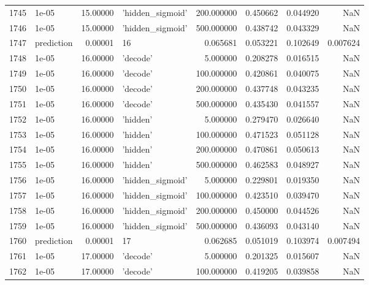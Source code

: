 \documentclass[10pt,a4paper]{article}
\begin{document}
\begin{tabular}{llrlrrrr}
1745 &       1e-05 &  15.00000 &   'hidden\_sigmoid' &  200.000000 &  0.450662 &  0.044920 &       NaN \\
1746 &       1e-05 &  15.00000 &   'hidden\_sigmoid' &  500.000000 &  0.438742 &  0.043329 &       NaN \\
1747 &  prediction &   0.00001 &                 16 &    0.065681 &  0.053221 &  0.102649 &  0.007624 \\
1748 &       1e-05 &  16.00000 &           'decode' &    5.000000 &  0.208278 &  0.016515 &       NaN \\
1749 &       1e-05 &  16.00000 &           'decode' &  100.000000 &  0.420861 &  0.040075 &       NaN \\
1750 &       1e-05 &  16.00000 &           'decode' &  200.000000 &  0.437748 &  0.043235 &       NaN \\
1751 &       1e-05 &  16.00000 &           'decode' &  500.000000 &  0.435430 &  0.041557 &       NaN \\
1752 &       1e-05 &  16.00000 &           'hidden' &    5.000000 &  0.279470 &  0.026640 &       NaN \\
1753 &       1e-05 &  16.00000 &           'hidden' &  100.000000 &  0.471523 &  0.051128 &       NaN \\
1754 &       1e-05 &  16.00000 &           'hidden' &  200.000000 &  0.470861 &  0.050613 &       NaN \\
1755 &       1e-05 &  16.00000 &           'hidden' &  500.000000 &  0.462583 &  0.048927 &       NaN \\
1756 &       1e-05 &  16.00000 &   'hidden\_sigmoid' &    5.000000 &  0.229801 &  0.019350 &       NaN \\
1757 &       1e-05 &  16.00000 &   'hidden\_sigmoid' &  100.000000 &  0.423510 &  0.039470 &       NaN \\
1758 &       1e-05 &  16.00000 &   'hidden\_sigmoid' &  200.000000 &  0.450000 &  0.044526 &       NaN \\
1759 &       1e-05 &  16.00000 &   'hidden\_sigmoid' &  500.000000 &  0.436093 &  0.043140 &       NaN \\
1760 &  prediction &   0.00001 &                 17 &    0.062685 &  0.051019 &  0.103974 &  0.007494 \\
1761 &       1e-05 &  17.00000 &           'decode' &    5.000000 &  0.201325 &  0.015607 &       NaN \\
1762 &       1e-05 &  17.00000 &           'decode' &  100.000000 &  0.419205 &  0.039858 &       NaN \\

\end{tabular}
\end{document}
